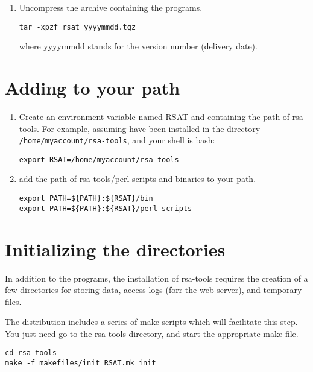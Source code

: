 \documentclass{article}
\begin{document}
\begin{enumerate}

\item Uncompress the archive containing the programs. 
\begin{verbatim}
tar -xpzf rsat_yyyymmdd.tgz
\end{verbatim}

where yyyymmdd stands for the version number (delivery date).

\end{enumerate}

\section{Adding \RSAT to your path}

\begin{enumerate}

\item Create an environment variable named RSAT and containing the
path of rsa-tools. For example, assuming \RSAT have been installed in
the directory \texttt{/home/myaccount/rsa-tools}, and your shell is
bash:

\begin{verbatim}
export RSAT=/home/myaccount/rsa-tools
\end{verbatim}

\item add the path of rsa-tools/perl-scripts and binaries to your path.

\begin{verbatim}
export PATH=${PATH}:${RSAT}/bin
export PATH=${PATH}:${RSAT}/perl-scripts
\end{verbatim}

\end{enumerate}


\section{Initializing the directories}

In addition to the programs, the installation of rsa-tools requires
the creation of a few directories for storing data, access logs (forr
the web server), and temporary files.  

The distribution includes a series of make scripts which will
facilitate this step. You just need go to the rsa-tools directory, and
start the appropriate make file.

\begin{verbatim}
cd rsa-tools
make -f makefiles/init_RSAT.mk init
\end{verbatim}
\end{document}
